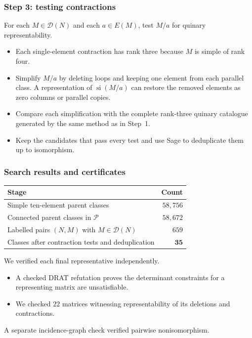 \documentclass{beamer}
\newcommand{\si}{\operatorname{si}}
\begin{document}
\begin{frame}
  \frametitle{Step 3: testing contractions}
  For each $M\in\mathcal D(N)$ and each $a\in E(M)$, test
  $M/a$ for quinary representability.
  \begin{itemize}
    \item Each single-element contraction has rank three because
      $M$ is simple of rank four.
    \item Simplify $M/a$ by deleting loops and keeping one element from
      each parallel class. A representation of $\si(M/a)$ can restore
      the removed elements as zero columns or parallel copies.
    \item Compare each simplification with the complete rank-three
      quinary catalogue generated by the same method as in Step~1.
    \item Keep the candidates that pass every test and use Sage to
      deduplicate them up to isomorphism.
  \end{itemize}
\end{frame}

\begin{frame}
  \frametitle{Search results and certificates}
  \begin{center}
    \begin{tabular}{lr}
      \textbf{Stage} & \textbf{Count} \\
      \hline
      Simple ten-element parent classes & $58{,}756$ \\
      Connected parent classes in $\mathcal P$ & $58{,}672$ \\
      Labelled pairs $(N,M)$ with $M\in\mathcal D(N)$ & $659$ \\
      Classes after contraction tests and deduplication & $\mathbf{35}$
    \end{tabular}
  \end{center}
  We verified each final representative independently.
  \begin{itemize}
    \item A checked DRAT refutation proves the determinant constraints
      for a representing matrix are unsatisfiable.
    \item We checked $22$ matrices witnessing representability of its
      deletions and contractions.
  \end{itemize}
  A separate incidence-graph check verified pairwise nonisomorphism.
\end{frame}
\end{document}

